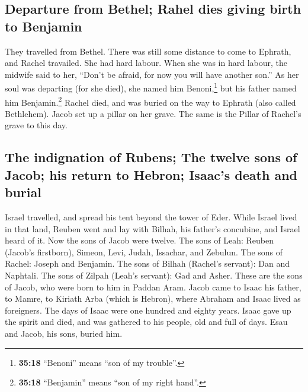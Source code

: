 \hypertarget{departure-from-bethel-rahel-dies-giving-birth-to-benjamin}{%
\subsection{Departure from Bethel; Rahel dies giving birth to
Benjamin}\label{departure-from-bethel-rahel-dies-giving-birth-to-benjamin}}

 They travelled from Bethel. There was still some
distance to come to Ephrath, and Rachel travailed. She had hard labour.
 When she was in hard labour, the midwife said to her,
``Don't be afraid, for now you will have another son.'' 
As her soul was departing (for she died), she named him
Benoni,\footnote{\textbf{35:18} ``Benoni'' means ``son of my trouble''.}
but his father named him Benjamin.\footnote{\textbf{35:18} ``Benjamin''
  means ``son of my right hand''.}  Rachel died, and was
buried on the way to Ephrath (also called Bethlehem). 
Jacob set up a pillar on her grave. The same is the Pillar of Rachel's
grave to this day.

\hypertarget{the-indignation-of-rubens-the-twelve-sons-of-jacob-his-return-to-hebron-isaacs-death-and-burial}{%
\subsection{The indignation of Rubens; The twelve sons of Jacob; his
return to Hebron; Isaac's death and
burial}\label{the-indignation-of-rubens-the-twelve-sons-of-jacob-his-return-to-hebron-isaacs-death-and-burial}}

 Israel travelled, and spread his tent beyond the tower
of Eder.  While Israel lived in that land, Reuben went
and lay with Bilhah, his father's concubine, and Israel heard of it. Now
the sons of Jacob were twelve.  The sons of Leah: Reuben
(Jacob's firstborn), Simeon, Levi, Judah, Issachar, and Zebulun.
 The sons of Rachel: Joseph and Benjamin. 
The sons of Bilhah (Rachel's servant): Dan and Naphtali. 
The sons of Zilpah (Leah's servant): Gad and Asher. These are the sons
of Jacob, who were born to him in Paddan Aram.  Jacob
came to Isaac his father, to Mamre, to Kiriath Arba (which is Hebron),
where Abraham and Isaac lived as foreigners.  The days of
Isaac were one hundred and eighty years.  Isaac gave up
the spirit and died, and was gathered to his people, old and full of
days. Esau and Jacob, his sons, buried him.

